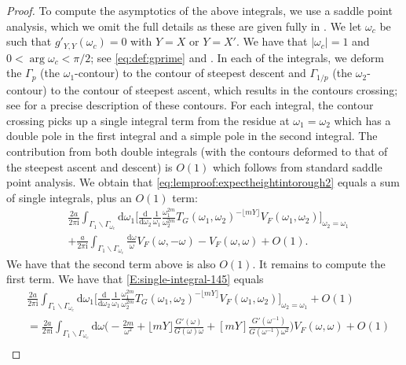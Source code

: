 \documentclass[11pt,twoside]{amsart}
\theoremstyle{plain}
\numberwithin{quest}{section}
\theoremstyle{remark}
\numberwithin{rem}{section}
\theoremstyle{definition}
\begin{document}
{\begin{proof}
			To compute the asymptotics of the above integrals, we use a saddle point analysis, which we omit the full details as these are given fully in  \cite[Section 3.6]{CJ16}.  We let $\omega_c$ be such that $g'_{Y,Y}(\omega_c)=0$ with $Y=X$ or $Y=X'$. We have that $|\omega_c|=1$ and $0<\arg \omega_c <\pi/2$; see \eqref{eq:def:gprime} and \cite[Lemma 3.18]{CJ16}.  In each of the integrals, we deform the $\Gamma_p$ (the $\omega_1$-contour) to the contour of steepest descent and $\Gamma_{1/p}$ (the $\omega_2$-contour) to the contour of steepest ascent, which results in the contours crossing; see \cite[Lemma 3.20]{CJ16} for a precise description of these contours. For each integral, the contour crossing picks up a single integral term from the residue at $\omega_1=\omega_2$ which has a double pole in the first integral and a simple pole in the second integral.  The contribution from both double integrals (with the contours deformed to that of the steepest ascent and descent) is $O(1)$ which follows from standard saddle point analysis.  
			We obtain that \eqref{eq:lemproof:expectheightintorough2} equals a sum of single integrals, plus an $O(1)$ term:
			\begin{equation}
            \label{E:single-integral-145}
				\begin{split}
					&\frac{2a}{2\pi \mathrm{i}} \int_{\Gamma_1 \backslash \Gamma_{\omega_c}} \mathrm{d} \omega_1\bigg[ \frac{ \mathrm{d}  }{ \mathrm{d} \omega_2}\frac{1}{\omega_1} \frac{\omega_1^{2m}}{\omega_2^{2m}}T_G(\omega_1,\omega_2)^{-\lfloor mY \rfloor} V_F(\omega_1,\omega_2) \bigg]_{\omega_2=\omega_1} \\
					&+\frac{a}{2\pi \mathrm{i}} \int_{\Gamma_1 \backslash \Gamma_{\omega_c}}\frac{ \mathrm{d} \omega}{\omega} V_F(\omega,-\omega)-V_F(\omega,\omega)+O(1).
				\end{split}
			\end{equation}
			We have that the second term above is also $O(1)$.  It remains to compute the first term.  We have that \eqref{E:single-integral-145} equals
			\begin{equation*}
				\begin{split}
					&\frac{2a}{2\pi \mathrm{i}} \int_{\Gamma_1 \backslash \Gamma_{\omega_c}} \mathrm{d} \omega_1\bigg[ \frac{ \mathrm{d}  }{ \mathrm{d} \omega_2}\frac{1}{\omega_1} \frac{\omega_1^{2m}}{\omega_2^{2m}}T_G(\omega_1,\omega_2)^{-\lfloor mY \rfloor} V_F(\omega_1,\omega_2) \bigg]_{\omega_2=\omega_1} +O(1)\\
					&=\frac{2a}{2\pi \mathrm{i}} \int_{\Gamma_1 \backslash \Gamma_{\omega_c}}\mathrm{d} \omega \bigg(-\frac{2m}{\omega^2}  + \lfloor mY \rfloor \frac{G'(\omega)}{G(\omega) \omega}+[mY] \frac{G'(\omega^{-1})}{G(\omega^{-1}) \omega^2}\bigg)V_F(\omega,\omega)+O(1)\\

\end{split}
\end{equation*}
\end{proof}}
\end{document}
